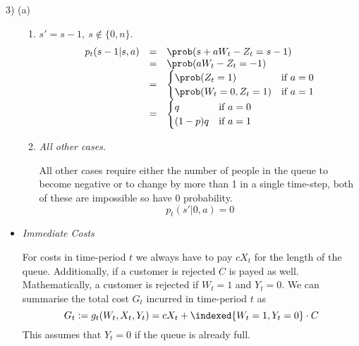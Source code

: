 \documentclass[11pt,a4paper]{article}
\begin{document}
\begin{answer}{3) (a)}
\begin{itemize}
\begin{enumerate}
      \item $s'=s-1,\ s\not\in\{0,n\}$.
      \[\begin{array}{rcl}
        p_t(s-1|s,a)&=&\prob(s+aW_t-Z_t=s-1)\\
        &=&\prob(aW_t-Z_t=-1)\\
        &=&\begin{cases}
             \prob(Z_t=1)&\text{if }a=0\\
             \prob(W_t=0,Z_t=1)&\text{if }a=1
           \end{cases}\\
        &=&\begin{cases}
             q&\text{if }a=0\\
             (1-p)q&\text{if }a=1
           \end{cases}
      \end{array}\]

      \item \textit{All other cases.}
      \par All other cases require either the number of people in the queue to become negative or to change by more than 1 in a single time-step, both of these are impossible so have 0 probability.
      \[ p_t(s'|0,a)=0 \]

    \end{enumerate}

    \item \textit{Immediate Costs}
    \par For costs in time-period $t$ we always have to pay $cX_t$ for the length of the queue. Additionally, if a customer is rejected $C$ is payed as well. Mathematically, a customer is rejected if $W_t=1$ and $Y_t=0$. We can summarise the total cost $G_t$ incurred in time-period $t$ as
    \[ G_t:=g_t(W_t,X_t,Y_t)=cX_t+\indexed\{W_t=1,Y_t=0\}\cdot C \]
    This assumes that $Y_t=0$ if the queue is already full.


\end{itemize}
\end{answer}
\end{document}
